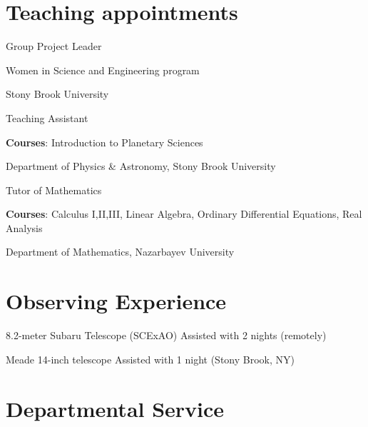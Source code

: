 \documentclass[10pt]{article} %
\begin{document}
\begin{paracol}{1}

	


\section{Teaching appointments} 
	{Group Project Leader}
	{ Women in Science and Engineering program
	
	Stony Brook University}
	
	{Teaching Assistant}
	{\textbf{Courses}: Introduction to Planetary Sciences
	
	Department of Physics \& Astronomy, Stony Brook University}
	
	
	{Tutor of Mathematics}
	{\textbf{Courses}: Calculus I,II,III, Linear Algebra, Ordinary Differential Equations, Real Analysis
	
	Department of Mathematics, Nazarbayev University}

\section{Observing Experience} 
	{8.2-meter Subaru Telescope (SCExAO)}
	{Assisted with 2 nights (remotely)}
	
	{Meade 14-inch telescope}
	{Assisted with 1 night (Stony Brook, NY)}

\section{Departmental Service}




\end{paracol}
\end{document}
